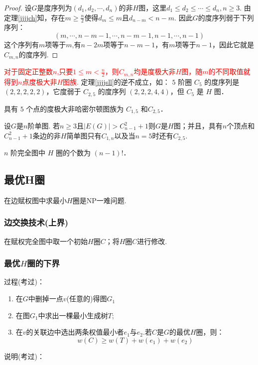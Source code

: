 \begin{proof}
	设$G$是度序列为$(d_1,d_2,\cdots, d_n)$的非$H$图，这里$d_1\leq d_2\leq \cdots\leq d_n, n\geq 3$. 由定理\ref{jjjjch}知，存在$m\geq \frac{n}{2}$使得$d_m\leq m$且$d_{n-m}<n-m$. 因此$G$的度序列弱于下列序列：
	\[
	(m,\cdots,n-m-1,\cdots,n-m-1, n-1,\cdots,n-1)
	\]
	这个序列有$m$项等于$m$,有$n-2m$项等于$n-m-1$，有$m$项等于$n-1$，因此它就是$C_{m,n}$的度序列.
\end{proof}
\begin{note}
\textcolor{red}{对于固定正整数$n$,只要$1\leq m < \frac{n}{2}$，则$C_{m,n}$均是度极大非$H$图，随$m$的不同取值就得到$n$点度极大非$H$图族.} 定理\ref{jjjjsll}的逆不成立，如： $5$ 阶圈 $C_5$ 的度序列是 $(2, 2, 2, 2, 2)$，它度弱于 $C_{2,5}$ 的度序列 $(2, 2, 2, 4, 4)$，但
$C_5$ 是 $H$ 图．
\end{note}
\begin{example}
	具有 $5$ 个点的度极大非哈密尔顿图族为 $C_{1,5}$ 和$ C_{2,5}$．
\end{example}


\begin{corollary}
设$G$是$n$阶单图. 若$n\geq 3$且$|E(G)|>C_{n-1}^2+1$则$G$是$H$图；并且，具有$n$个顶点和$C_{n-1}^2+1$条边的非$H$简单图只有$C_{1,n}$以及当$n=5$时还有$C_{2,5}$.
\end{corollary}
\begin{note}
	$n$ 阶完全图中 $H$ 圈的个数为 $(n - 1)!$．
\end{note}





\subsection{最优H圈}

在边赋权图中求最小$H$圈是NP一难问题.

\subsubsection{边交换技术(上界)}
在赋权完全图中取一个初始$H$圈$C$；将$H$圈$C$进行修改.

\subsubsection{最优$H$圈的下界}
\noindent 过程(考过)：
\begin{enumerate}
	\item 在$G$中删掉一点$v$(任意的)得图$G_1$
	\item  在图$G_1$中求出一棵最小生成树$T$;
	\item 在$v$的关联边中选出两条权值最小者$e_1$与$e_2$.若$C$是$G$的最优$H$圈，则：
	\[
	 w(C)\geq w(T)+w(e_1)+w(e_2)
	\]
\end{enumerate}
\noindent 说明(考过)：

